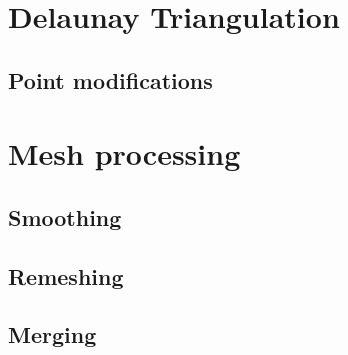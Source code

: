 \section{Delaunay Triangulation}
\subsection{Point modifications}
\section{Mesh processing}
\subsection{Smoothing}
\subsection{Remeshing}
\subsection{Merging}